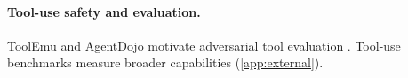 \paragraph{Tool-use safety and evaluation.}
ToolEmu and AgentDojo motivate adversarial tool evaluation
\citep{ruan2024toolemu,debenedetti2024agentdojo}. Tool-use benchmarks
\citep{patil2025bfcl,qin2023toolllm,basu2025nestful,li2023apibank,trivedi2024appworld,lu2025toolsandbox,barres2025tau2}
measure broader capabilities (\cref{app:external}).
